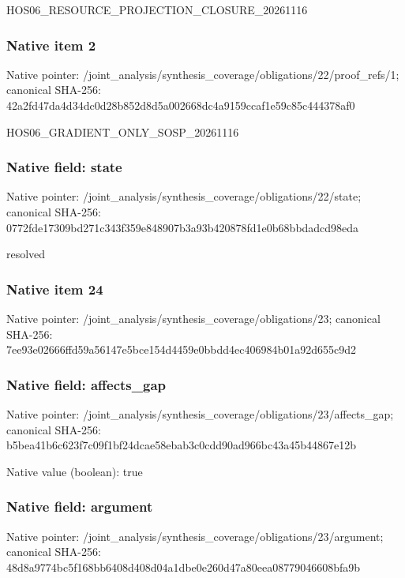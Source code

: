 \documentclass[10pt,a4paper]{article}
\begin{document}
\begingroup\raggedright\sloppy HOS06\_\allowbreak{}RESOURCE\_\allowbreak{}PROJECTION\_\allowbreak{}CLOSURE\_\allowbreak{}20261116\par\endgroup

\subsubsection{Native item 2}
Native pointer: /joint\_\allowbreak{}analysis/synthesis\_\allowbreak{}coverage/obligations/22/proof\_\allowbreak{}refs/1; canonical SHA-256: 42a2fd47da4d34dc0d28b852d8d5a002668dc4a9159ccaf1e59c85c444378af0

\begingroup\raggedright\sloppy HOS06\_\allowbreak{}GRADIENT\_\allowbreak{}ONLY\_\allowbreak{}SOSP\_\allowbreak{}20261116\par\endgroup

\subsubsection{Native field: state}
Native pointer: /joint\_\allowbreak{}analysis/synthesis\_\allowbreak{}coverage/obligations/22/state; canonical SHA-256: 0772fde17309bd271c343f359e848907b3a93b420878fd1e0b68bbdadcd98eda

\begingroup\raggedright\sloppy resolved\par\endgroup

\subsubsection{Native item 24}
Native pointer: /joint\_\allowbreak{}analysis/synthesis\_\allowbreak{}coverage/obligations/23; canonical SHA-256: 7ee93e02666ffd59a56147e5bce154d4459e0bbdd4ec406984b01a92d655c9d2

\subsubsection{Native field: affects\_\allowbreak{}gap}
Native pointer: /joint\_\allowbreak{}analysis/synthesis\_\allowbreak{}coverage/obligations/23/affects\_\allowbreak{}gap; canonical SHA-256: b5bea41b6c623f7c09f1bf24dcae58ebab3c0cdd90ad966bc43a45b44867e12b

Native value (boolean): true

\subsubsection{Native field: argument}
Native pointer: /joint\_\allowbreak{}analysis/synthesis\_\allowbreak{}coverage/obligations/23/argument; canonical SHA-256: 48d8a9774bc5f168bb6408d408d04a1dbe0e260d47a80eea08779046608bfa9b
\end{document}
